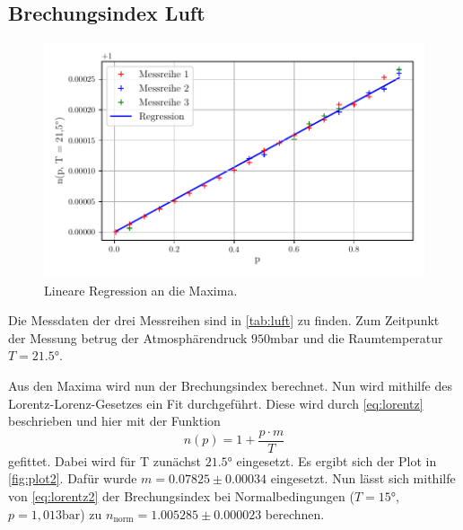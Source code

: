 \subsection{Brechungsindex Luft}
\begin{figure}
    \centering
    \includegraphics[width = 0.7 \linewidth]{build/Luft.pdf}
    \caption{Lineare Regression an die Maxima.}
    \label{fig:plot2}
\end{figure}
Die Messdaten der drei Messreihen sind in \autoref{tab:luft} zu finden.
Zum Zeitpunkt der Messung betrug der Atmosphärendruck $950 \unit{\milli\bar}$ und die Raumtemperatur $T = 21.5 \unit\degree$.

Aus den Maxima wird nun der Brechungsindex berechnet.
Nun wird mithilfe des Lorentz-Lorenz-Gesetzes ein Fit durchgeführt.
Diese wird durch \autoref{eq:lorentz} beschrieben und hier mit der Funktion
\begin{equation} \label{eq:lorentz2}
    n(p) = 1 + \frac{p \cdot m}{T}
\end{equation}
gefittet. Dabei wird für T zunächst $21.5°$ eingesetzt.
Es ergibt sich der Plot in \autoref{fig:plot2}.
Dafür wurde $m = 0.07825 \pm 0.00034$ eingesetzt.
Nun lässt sich mithilfe von \autoref{eq:lorentz2} der Brechungsindex bei Normalbedingungen ($T = 15°$, $p = 1,013 \unit{\bar}$) zu $n_{\text{norm}} = 1.005285 \pm 0.000023$ berechnen.